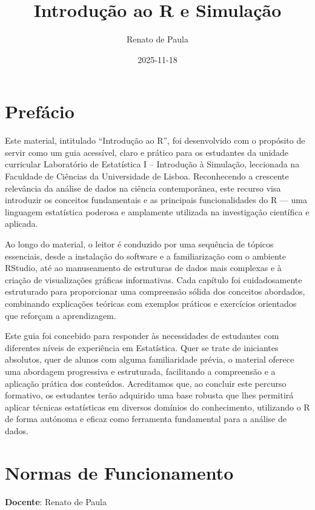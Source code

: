 \documentclass[
]{book}
\title{Introdução ao R e Simulação}
\author{Renato de Paula}
\date{2025-11-18}
\begin{document}
\maketitle

{
\setcounter{tocdepth}{1}
\tableofcontents
}
\chapter{Prefácio}\label{prefuxe1cio}

Este material, intitulado ``Introdução ao R'', foi desenvolvido com o propósito de servir como um guia acessível, claro e prático para os estudantes da unidade curricular Laboratório de Estatística I -- Introdução à Simulação, leccionada na Faculdade de Ciências da Universidade de Lisboa. Reconhecendo a crescente relevância da análise de dados na ciência contemporânea, este recurso visa introduzir os conceitos fundamentais e as principais funcionalidades do R --- uma linguagem estatística poderosa e amplamente utilizada na investigação científica e aplicada.

Ao longo do material, o leitor é conduzido por uma sequência de tópicos essenciais, desde a instalação do software e a familiarização com o ambiente RStudio, até ao manuseamento de estruturas de dados mais complexas e à criação de visualizações gráficas informativas. Cada capítulo foi cuidadosamente estruturado para proporcionar uma compreensão sólida dos conceitos abordados, combinando explicações teóricas com exemplos práticos e exercícios orientados que reforçam a aprendizagem.

Este guia foi concebido para responder às necessidades de estudantes com diferentes níveis de experiência em Estatística. Quer se trate de iniciantes absolutos, quer de alunos com alguma familiaridade prévia, o material oferece uma abordagem progressiva e estruturada, facilitando a compreensão e a aplicação prática dos conteúdos. Acreditamos que, ao concluir este percurso formativo, os estudantes terão adquirido uma base robusta que lhes permitirá aplicar técnicas estatísticas em diversos domínios do conhecimento, utilizando o R de forma autónoma e eficaz como ferramenta fundamental para a análise de dados.

\chapter{Normas de Funcionamento}\label{normas-de-funcionamento}

\textbf{Docente}: Renato de Paula
\end{document}
